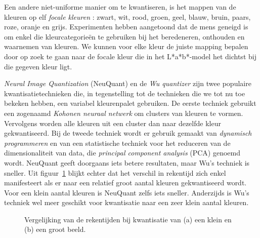 Een andere niet-uniforme manier om te kwantiseren, is het mappen van de kleuren op elf 
\emph{focale kleuren} \cite{van_den_broek:human_color_categorization_for_cbir}: zwart, wit, rood, groen, geel, blauw, bruin, paars, roze, oranje en grijs.
Experimenten hebben aangetoond dat de mens geneigd is om enkel die kleurcategorie\"en te gebruiken bij 
het beredeneren, onthouden en waarnemen van kleuren. We kunnen voor elke kleur de juiste mapping bepalen
door op zoek te gaan naar de focale kleur die in het L*a*b*-model het dichtst bij die gegeven kleur ligt.

\emph{Neural Image Quantization} (NeuQuant) \cite{dekker:neuquant} en de \emph{Wu quantizer} 
\cite{wu:color_quantization_by_dynamic_programming_and_principal_analysis} zijn twee
populaire kwantisatietechnieken die, in tegenstelling tot de technieken die we 
tot nu toe bekeken hebben, een variabel kleurenpalet gebruiken. De eerste techniek gebruikt een
zogenaamd \emph{Kohonen neuraal netwerk} om clusters van kleuren te vormen. Vervolgens worden 
alle kleuren uit een cluster dan naar dezelfde kleur gekwantiseerd. Bij de tweede techniek 
wordt er gebruik gemaakt van \emph{dynamisch programmeren} en van een statistische techniek voor 
het reduceren van de dimensionaliteit van data, 
die \emph{principal component analysis} (PCA) genoemd wordt. 
NeuQuant geeft doorgaans iets betere resultaten, maar Wu's techniek is
sneller. Uit figuur~\ref{fig:rekentijden_quant} blijkt echter dat het verschil in rekentijd zich
enkel manifesteert als er naar een relatief groot aantal kleuren gekwantiseerd wordt. Voor een
klein aantal kleuren is NeuQuant zelfs iets sneller. Anderzijds is Wu's techniek wel meer
geschikt voor kwantisatie naar een zeer klein aantal kleuren.
 

\begin{figure}[bp]
\vspace{10pt}
\centering
{}
\caption{\label{fig:rekentijden_quant}Vergelijking van de rekentijden bij kwantisatie van 
(a) een klein en (b) een groot beeld.}
\end{figure}

